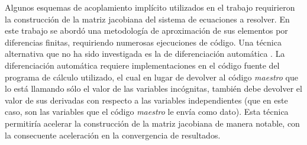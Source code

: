 Algunos esquemas de acoplamiento implícito utilizados en el trabajo requirieron la construcción de la matriz jacobiana del sistema de ecuaciones a resolver.
En este trabajo se abordó una metodología de aproximación de sus elementos por diferencias finitas, requiriendo numerosas ejecuciones de código.
Una técnica alternativa que no ha sido investigada es la de diferenciación automática \cite{griewank}.
La diferenciación automática requiere implementaciones en el código fuente del programa de cálculo utilizado,
el cual en lugar de devolver al código \textit{maestro} que lo está llamando sólo el valor de las variables incógnitas,
también debe devolver el valor de sus derivadas con respecto a las variables independientes
(que en este caso, son las variables que el código \textit{maestro} le envía como dato).
Esta técnica permitiría acelerar la construcción de la matriz jacobiana de manera notable,
con la consecuente aceleración en la convergencia de resultados.
